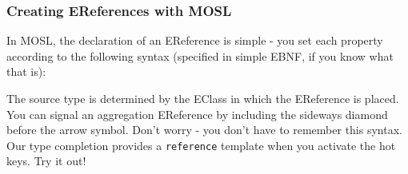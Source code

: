 \newpage
\subsubsection{Creating EReferences with MOSL}
\texHeader
\hypertarget{static:references tex}{}

In MOSL, the declaration of an EReference is simple - you set each property according to the following syntax (specified in simple EBNF, if you know what that
is):


The source type is determined by the EClass in which the EReference is placed. You can signal an aggregation EReference by including the sideways diamond before
the arrow symbol. Don't worry - you don't have to remember this syntax. Our type completion provides a \texttt{reference} template when you activate the hot
keys. Try it out!

